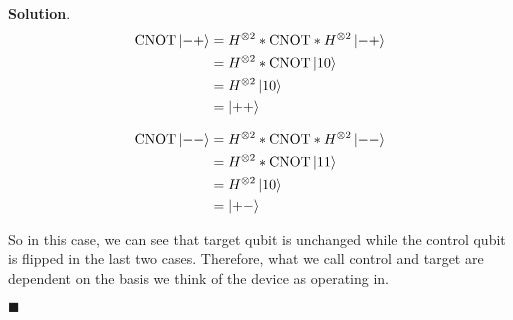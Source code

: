 \documentclass[12pt]{article}
\theoremstyle{definition}
\newenvironment{s}{%
        \begin{trivlist} \item \textbf{Solution}. }{%
            \hspace*{\fill} $\blacksquare$\end{trivlist}}%
\begin{document}
{\begin{s}
\begin{align*}
\mathrm{CNOT}\ket{-+}  &= H^{\otimes 2}*\mathrm{CNOT}*H^{\otimes 2}\ket{-+}\\  
&=  H^{\otimes 2}*\mathrm{CNOT}\ket{10}\\
&= H^{\otimes 2}\ket{10}\\
&= \ket{++}
\end{align*}

\begin{align*}
\mathrm{CNOT}\ket{--}  &= H^{\otimes 2}*\mathrm{CNOT}*H^{\otimes 2}\ket{--}\\  
&=  H^{\otimes 2}*\mathrm{CNOT}\ket{11}\\
&= H^{\otimes 2}\ket{10}\\
&= \ket{+-}
\end{align*}

So in this case, we can see that target qubit is unchanged while the control qubit is flipped in the last two cases. Therefore, what we call control and target are dependent on the basis we think of the device as operating in.

\end{s}
\end{document}
